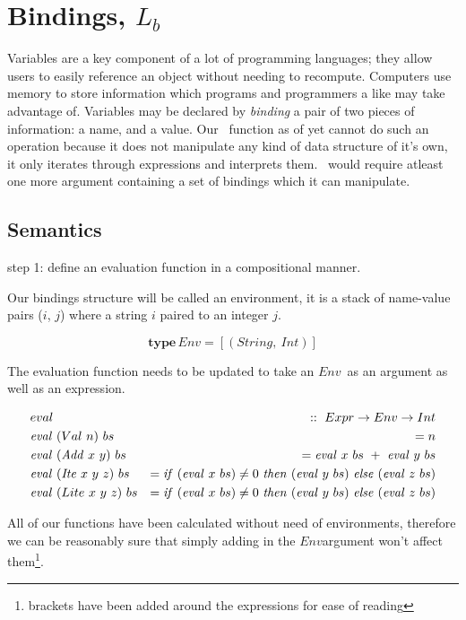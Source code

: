 \documentclass {article}
\begin{document}
\pagebreak
\section{Bindings, $L_b$} \label{langbind}

Variables are a key component
of a lot of programming languages;
they allow users to easily reference
an object without needing to recompute.
Computers use memory to store information
which programs and programmers a like may
take advantage of.
Variables may be declared by \emph{binding}
a pair of two pieces of information:
a name, and a value.
Our \eval\ function as of yet 
cannot do such an operation
because it does not manipulate any kind of
data structure of it's own,
it only iterates through
expressions and interprets them.
\eval\ would require atleast one more argument
containing a set of bindings which it can
manipulate.

\subsection{Semantics}

step 1: define an evaluation 
	function in a compositional manner.

Our bindings structure will be called
an environment, it is a stack
of name-value pairs ($i$, $j$) where
a string $i$ paired to an integer $j$.
\newcommand{\env}{$Env$}

	\[ \textbf{type} \, Env = [(String,\ Int)]\]

The evaluation function needs to be updated
to take an \env\ as an argument as well as
an expression.

\begin{eqnarray*}
	&eval              	   		&::\  Expr \rightarrow Env \rightarrow Int \\
	&\evalf  (Val\ n)\ bs 		&=   n \\
	&\evalf  (\Add x\ y)\ bs		&=   \evalf  x\ bs\ +\ \evalf  y\ bs \\
	&\evalf  (\Ite x\ y\ z)\ bs	&=   \ifff (\evalf  x\ bs) \not= 0\ \tthen (\evalf  y\ bs)\ \eelse (\evalf  z\ bs) \\
	&\evalf  (Lite\ x\ y\ z)\ bs 	&=   \ifff (\evalf  x\ bs) \not= 0\ \tthen (\evalf  y\ bs)\ \eelse (\evalf  z\ bs)
\end{eqnarray*}

All of our functions
have been calculated without need of environments,
therefore we can be reasonably sure that simply adding in the
\env argument won't affect them\footnote{
brackets have been added around the expressions for ease of reading}.
\end{document}

